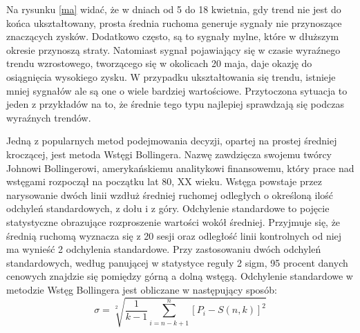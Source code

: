 \documentclass[pdflatex,11pt]{aghdpl}
\begin{document}
Na rysunku \ref{ma} widać, że w dniach od 5 do 18 kwietnia, gdy trend nie jest do końca ukształtowany, prosta średnia ruchoma generuje sygnały nie przynoszące znaczących zysków. Dodatkowo często, są to sygnały mylne, które w dłuższym okresie przynoszą straty. Natomiast sygnał pojawiający się w czasie wyraźnego trendu wzrostowego, tworzącego się w okolicach 20 maja, daje okazję do osiągnięcia wysokiego zysku. W przypadku ukształtowania się trendu, istnieje mniej sygnałów ale są one o wiele bardziej wartościowe. Przytoczona sytuacja to jeden z przykładów na to, że średnie tego typu najlepiej sprawdzają się podczas wyraźnych trendów.

Jedną z popularnych metod podejmowania decyzji, opartej na prostej średniej kroczącej, jest metoda Wstęgi Bollingera. Nazwę zawdzięcza swojemu twórcy Johnowi Bollingerowi, amerykańskiemu analitykowi finansowemu, który prace nad wstęgami rozpoczął na początku lat 80, XX wieku. Wstęga powstaje przez narysowanie dwóch linii wzdłuż średniej ruchomej odległych o określoną ilość odchyleń standardowych, z dołu i z góry. Odchylenie standardowe to pojęcie statystyczne obrazujące rozproszenie wartości wokół średniej. Przyjmuje się, że średnią ruchomą wyznacza się z 20 sesji oraz odległość linii kontrolnych od niej ma wynieść 2 odchylenia standardowe. Przy zastosowaniu dwóch odchyleń standardowych, według panującej w statystyce reguły 2 sigm, 95 procent danych cenowych znajdzie się pomiędzy górną a dolną wstęgą\cite{5}. Odchylenie standardowe w metodzie Wstęg Bollingera jest obliczane w następujący sposób:
\begin{equation}
\sigma = \sqrt[2 ]{\frac{1}{k-1} \sum_{i=n-k+1}^{n}{[{P_{i}-S(n,k)}]}^{2} } 
\label{eqn:wzor}
\end{equation}
\end{document}
